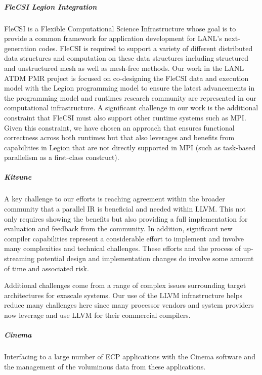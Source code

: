 \subparagraph{FleCSI Legion Integration}
FleCSI is a Flexible Computational Science Infrastructure whose goal is to provide a common framework for application development for LANL's next-generation codes. FleCSI is required to support a variety of different distributed data structures and computation on these data structures including structured and unstructured mesh as well as mesh-free methods. Our work in the LANL ATDM PMR project is focused on co-designing the FleCSI data and execution model with the Legion programming model to ensure the latest advancements in the programming model and runtimes research community are represented in our computational infrastructure. A significant challenge in our work is the additional constraint that FleCSI must also support other runtime systems such as MPI. Given this constraint, we have chosen an approach that ensures functional correctness across both runtimes but that also leverages and benefits from capabilities in Legion that are not directly supported in MPI (such as task-based parallelism as a first-class construct). 

\subparagraph{Kitsune}
A key challenge to our efforts is reaching agreement within the
broader community that a parallel IR is
beneficial and needed within LLVM.  This not only requires showing the
benefits but also providing a full implementation for evaluation and
feedback from the community.  In addition, significant new compiler
capabilities represent a considerable effort to implement and involve
many complexities and technical challenges.  These efforts and the
process of up-streaming potential design and implementation changes do
involve some amount of time and associated risk.

Additional challenges come from a range of complex issues surrounding
target architectures for exascale systems.  Our use of the LLVM
infrastructure helps reduce many challenges here since many processor
vendors and system providers now leverage and use LLVM for their
commercial compilers.

\subparagraph{Cinema}
Interfacing to a large number of ECP applications with the Cinema
software and the management of the voluminous data from these
applications. 

